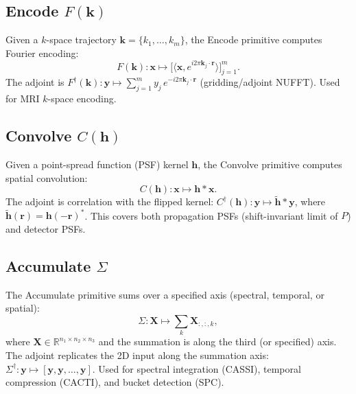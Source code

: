 \documentclass[11pt]{article}
\begin{document}
\subsection{Encode \texorpdfstring{$F(\mathbf{k})$}{F(k)}}

\begin{definition}[Encode]
\label{def:encode}
Given a $k$-space trajectory $\mathbf{k} = \{k_1, \ldots, k_m\}$, the Encode primitive computes Fourier encoding:
\begin{equation}
  F(\mathbf{k}): \mathbf{x} \mapsto \bigl[\langle \mathbf{x}, e^{i 2\pi \mathbf{k}_j \cdot \mathbf{r}} \rangle\bigr]_{j=1}^{m}.
\end{equation}
The adjoint is $F^\dagger(\mathbf{k}): \mathbf{y} \mapsto \sum_{j=1}^{m} y_j\, e^{-i 2\pi \mathbf{k}_j \cdot \mathbf{r}}$ (gridding/adjoint NUFFT). Used for MRI $k$-space encoding.
\end{definition}

\subsection{Convolve \texorpdfstring{$C(\mathbf{h})$}{C(h)}}

\begin{definition}[Convolve]
\label{def:convolve}
Given a point-spread function (PSF) kernel $\mathbf{h}$, the Convolve primitive computes spatial convolution:
\begin{equation}
  C(\mathbf{h}): \mathbf{x} \mapsto \mathbf{h} * \mathbf{x}.
\end{equation}
The adjoint is correlation with the flipped kernel: $C^\dagger(\mathbf{h}): \mathbf{y} \mapsto \tilde{\mathbf{h}} * \mathbf{y}$, where $\tilde{\mathbf{h}}(\mathbf{r}) = \mathbf{h}(-\mathbf{r})^*$. This covers both propagation PSFs (shift-invariant limit of $P$) and detector PSFs.
\end{definition}

\subsection{Accumulate \texorpdfstring{$\Sigma$}{Sigma}}

\begin{definition}[Accumulate]
\label{def:accumulate}
The Accumulate primitive sums over a specified axis (spectral, temporal, or spatial):
\begin{equation}
  \Sigma: \mathbf{X} \mapsto \sum_{k} \mathbf{X}_{:,:,k},
\end{equation}
where $\mathbf{X} \in \mathbb{R}^{n_1 \times n_2 \times n_3}$ and the summation is along the third (or specified) axis. The adjoint replicates the 2D input along the summation axis: $\Sigma^\dagger: \mathbf{y} \mapsto [\mathbf{y}, \mathbf{y}, \ldots, \mathbf{y}]$. Used for spectral integration (CASSI), temporal compression (CACTI), and bucket detection (SPC).
\end{definition}
\end{document}
